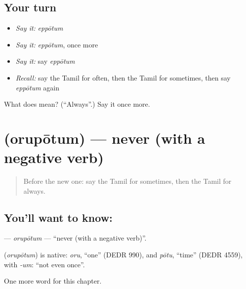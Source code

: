 \subsection*{Your turn}
\begin{itemize}
\raggedright
  \item \emph{Say it:} \emph{eppōtum}
  \item \emph{Say it:} \emph{eppōtum}, once more
  \item \emph{Say it:} say \emph{eppōtum}
  \item \emph{Recall:} say the Tamil for often, then the Tamil for sometimes, then say \emph{eppōtum} again
\end{itemize}

\begin{tcolorbox}[breakable,colback=teal!4,colframe=teal!35!black,title={Before you move on}]
What does  mean? (\textquotedblleft{}Always\textquotedblright{}.) Say it once more.
\end{tcolorbox}
\section[\texorpdfstring{\ta{ஒருபோதும்} (orupōtum)}{ஒருபோதும் (orupōtum)}]{ (orupōtum) — never (with a negative verb)}

\label{lesson:TA-C171-orupotum}



\begin{quote}
Before the new one: say the Tamil for sometimes, then the Tamil for always.
\end{quote}

\subsection*{You'll want to know: }
\textbf{} — \emph{orupōtum} — \textquotedblleft{}never (with a negative verb)\textquotedblright{}.

\begin{cousinweb}
\textbf{} (\emph{orupōtum}) is native: \emph{oru}, \textquotedblleft{}one\textquotedblright{} (DEDR 990), and \emph{pōtu}, \textquotedblleft{}time\textquotedblright{} (DEDR 4559), with \emph{-um}: \textquotedblleft{}not even once\textquotedblright{}.
\end{cousinweb}

\begin{grammarlens}[title={What you've built}]
One more word for this chapter.
\end{grammarlens}

